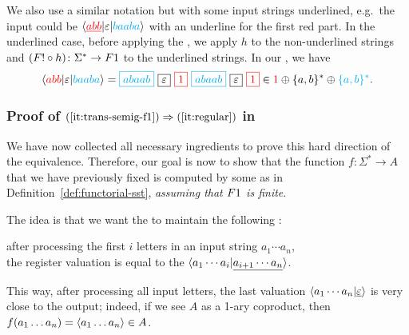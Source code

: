 We also use a similar notation but with some input strings underlined, e.g.~the input could be $\langle {\color{red}\underline{abb}} | \varepsilon | {\color{cyan}baaba} \rangle$ with an underline for the first red part. In the underlined case, before applying the , we apply $h$ to the non-underlined strings and
$(\functor! \circ h) \colon \Sigma^* \to \functor1$
to the underlined strings. In our , we have
\begin{align*}
  \tuple{\red{abb} | \varepsilon | \blue{baaba}} =  
  \blue{\boxed{abaab}} \ 
  \boxed{\varepsilon} \ 
  \red{\boxed{1}} \ 
  \blue{\boxed{abaab}} \
  \boxed{\varepsilon} \
  \red{\boxed{1}}
  \in \red{1} \oplus \set{a,b}^*  \oplus \blue{\set{a,b}^*}.
\end{align*}

\subsubsection{Proof of $(\ref{it:trans-semig-f1}) \Rightarrow (\ref{it:regular})$ in }
We have now collected all necessary ingredients to prove this hard direction of
the equivalence. Therefore, our goal is now to show that the function $f\colon
\Sigma^* \to A$ that we have previously fixed is computed by some  as in Definition~\ref{def:functorial-sst},
\emph{assuming that $\functor 1$ is finite}.

The idea is that we want the \functorialsst to maintain the following : 
\begin{center}
  after processing the first $i$ letters in an input string $a_1 \cdots a_n$,\\ the register valuation is equal to the \kl{factorized output} $\langle a_1 \cdots a_i | \underline{a_{i+1} \cdots a_n} \rangle$.
\end{center}
 This way, after processing all input letters, the last valuation $\langle a_1 \cdots a_n | \underline{\varepsilon} \rangle$ is very close to the output; indeed, if we see $A$ as a 1-ary coproduct, then $f(a_1\dots a_n) = \langle a_1 \dots a_n \rangle \in A$.

